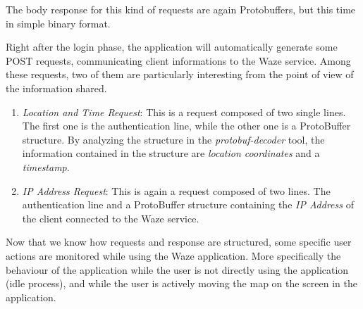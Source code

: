 			The body response for this kind of requests are again Protobuffers, but this time in simple binary format.\newline
			\par Right after the login phase, the application will automatically generate some POST requests, communicating client informations to the Waze service. Among these requests, two of them are particularly interesting from the point of view of the information shared.
			\begin{enumerate}
				\item \textit{Location and Time Request}: This is a request composed of two single lines. The first one is the authentication line, while the other one is a ProtoBuffer structure. By analyzing the structure in the \textit{protobuf-decoder} tool, the information contained in the structure are \textit{location coordinates} and a \textit{timestamp}.
				\item \textit{IP Address Request}: This is again a request composed of two lines. The authentication line and a ProtoBuffer structure containing the \textit{IP Address} of the client connected to the Waze service.
			\end{enumerate}

			\par Now that we know how requests and response are structured, some specific user actions are monitored while using the Waze application. More specifically the behaviour of the application while the user is not directly using the application (idle process), and while the user is actively moving the map on the screen in the application.
			
